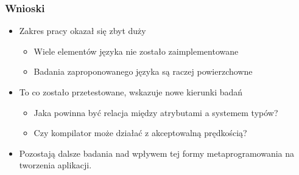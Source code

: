 \begin{frame}
	\frametitle{Wnioski}

	\begin{itemize}
		\item Zakres pracy okazał się zbyt duży\begin{itemize}
			\item Wiele elementów języka nie zostało zaimplementowane
			\item Badania zaproponowanego języka są raczej powierzchowne
		\end{itemize}
		\item To co zostało przetestowane, wskazuje nowe kierunki badań\begin{itemize}
			\item Jaka powinna być relacja między atrybutami a systemem typów?
			\item Czy kompilator może działać z akceptowalną prędkością?
		\end{itemize}
		\item Pozostają dalsze badania nad wpływem tej formy metaprogramowania na tworzenia aplikacji.
	\end{itemize}

\end{frame}
